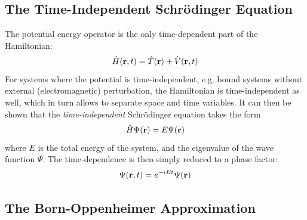 \subsection{The Time-Independent Schrödinger Equation}

The potential energy operator is the only time-dependent part of the Hamiltonian:
\begin{equation}
\hat{H}(\mathbf{r},t) = \hat{T}(\mathbf{r}) + \hat{V}(\mathbf{r},t)
\end{equation} 
\noindent For systems where the potential is time-independent, e.g. bound systems without external (electromagnetic) perturbation, the Hamiltonian is time-independent as well, which in turn allows to separate space and time variables. It can then be shown that the \emph{time-independent} Schrödinger equation takes the form
\begin{equation}
\hat{H}\Psi(\mathbf{r}) = E \Psi(\mathbf{r})
\end{equation}
\noindent where $E$ is the total energy of the system, and the eigenvalue of the wave function $\Psi$. The time-dependence is then simply reduced to a phase factor:
\begin{equation}
\Psi(\mathbf{r},t) = e^{-iEt} \Psi(\mathbf{r})
\end{equation}
\noindent 

\subsection{The Born-Oppenheimer Approximation}

